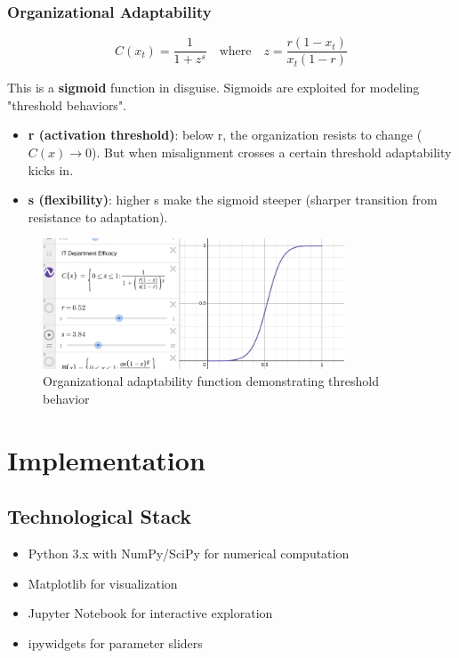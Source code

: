 \documentclass[a4paper, 12pt]{article}
\begin{document}
\subsubsection{Organizational Adaptability}
\begin{equation}
	C(x_t) = \frac{1}{1 + z^s} \quad \text{where} \quad z = \frac{r (1 - x_t)}{x_t (1 - r)}
\end{equation}

This is a \textbf{sigmoid} function in disguise. Sigmoids are exploited for modeling "threshold behaviors".

\begin{itemize}
	\item \textbf{r (activation threshold)}: below r, the organization resists to change ($C(x) \rightarrow 0$). But when misalignment crosses a certain threshold adaptability kicks in.
	\item \textbf{s (flexibility)}: higher s make the sigmoid steeper (sharper transition from resistance to adaptation).
\end{itemize}

\begin{figure}[h]
	\centering
	\includegraphics[width=0.8\textwidth]{../images/C(x)-desmos.png}
	\caption{Organizational adaptability function demonstrating threshold behavior}
\end{figure}


\section{Implementation}
\subsection{Technological Stack}
\begin{itemize}
	\item Python 3.x with NumPy/SciPy for numerical computation
	\item Matplotlib for visualization
	\item Jupyter Notebook for interactive exploration
	\item ipywidgets for parameter sliders
\end{itemize}
\end{document}

